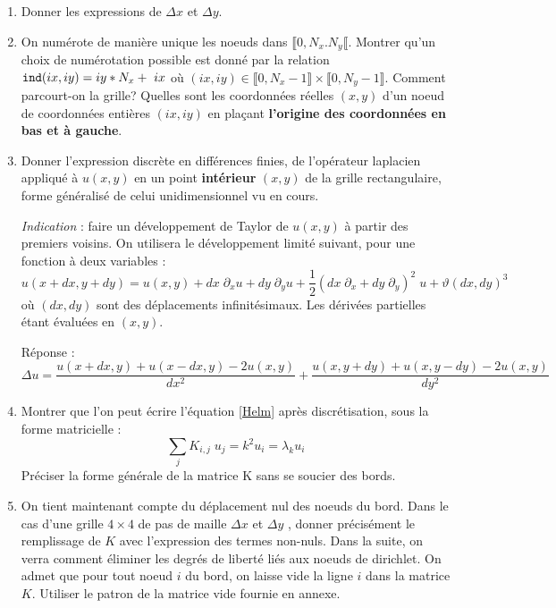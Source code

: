 \documentclass[a4paper, 12pt]{article}
\begin{document}
\begin{enumerate} 
\item Donner les expressions de $\Delta x$ et $\Delta y$.
 \item  On numérote de manière unique les noeuds dans $\llbracket 0, N_x. N_y  \llbracket$. 
Montrer qu'un choix de numérotation possible est donné par la relation 
${\tt ind}(ix, iy)=iy*N_x+~ix$ où
$(ix, iy) \in \llbracket 0, N_x-1 \rrbracket \times \llbracket 0, N_y-1  \rrbracket$.
Comment parcourt-on la grille? Quelles sont
les coordonnées réelles $(x, y)$ d'un noeud de coordonnées entières $(ix, iy)$ en plaçant
{\bf l'origine des coordonnées en bas et à gauche}.
    
 \item Donner l'expression discrète en différences finies, de l'opérateur laplacien appliqué à $u(x, y)$ 
 en un point {\bf intérieur} $(x, y)$ de la grille rectangulaire, forme généralisé de celui unidimensionnel vu en cours. 

 {\it Indication} : faire un développement de Taylor de $u(x, y)$ à partir des premiers voisins.
On utilisera le développement limité suivant, pour une fonction à deux variables :
  \begin{equation}
 u(x+dx, y+dy) = u(x, y) + dx\; \partial_x u + dy\;  \partial_y u + \frac{1}{2} (dx\;  \partial_x + dy\; \partial_y)^2 \; u+
 \vartheta(dx, dy)^3
\end{equation}
où $(dx, dy)$ sont des déplacements infinitésimaux. Les dérivées partielles étant évaluées en $(x, y)$. 

Réponse : $$\Delta u = \frac{u(x+dx, y)+u(x-dx, y)-2u(x, y)}{dx^2}+\frac{u(x, y+dy)+u(x, y-dy)-2u(x, y)}{dy^2}$$

\item Montrer que l'on peut écrire l'équation  \eqref{Helm}  après discrétisation, sous la forme matricielle :
\begin{equation}
\sum_j K_{i, j} \; u_j = k^2 u_i = \lambda_k u_i
\label{HelmDis}
\end{equation}
Préciser la forme générale de la matrice K sans se soucier des bords.

\item On tient maintenant compte du déplacement nul des noeuds du bord.
Dans le cas d'une grille $4 \times 4$ de pas de maille $\Delta x$ et $\Delta y$ , donner
précisément le remplissage de $K$ avec l'expression des termes non-nuls. 
Dans la suite, on verra comment éliminer les degrés de liberté liés aux noeuds de dirichlet.
On admet que pour tout noeud ${i}$ du bord, on laisse vide la ligne  ${i}$ dans la matrice $K$.
Utiliser le patron de la matrice vide fournie en annexe.

\end{enumerate} 
\end{document}
